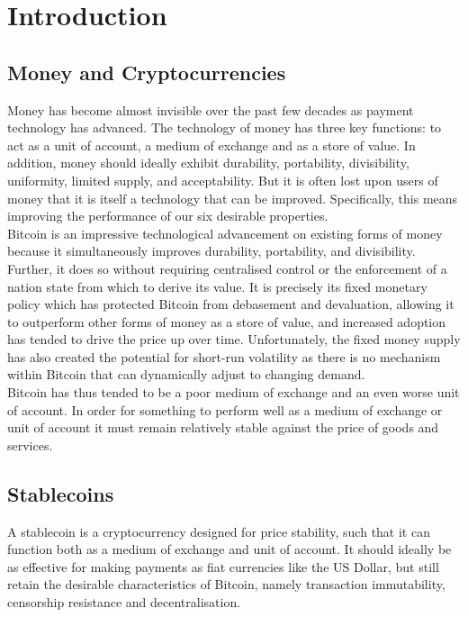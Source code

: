 \section{Introduction}

\subsection{Money and Cryptocurrencies}

Money has become almost invisible over the past few decades as payment technology has advanced. The technology of money has three key functions: to act as a unit of account, a medium of exchange
and as a store of value. In addition, money should ideally exhibit durability, portability, divisibility, uniformity, limited supply, and acceptability. But it is often lost upon users of money that it is itself a technology that can be improved. Specifically, this means improving the performance of our six desirable properties. \\

\noindent Bitcoin is an impressive technological advancement on existing forms of money because it
simultaneously improves durability, portability, and divisibility.
Further, it does so without requiring centralised control or the enforcement of a nation state from which to derive its value. It is precisely its fixed monetary policy which has protected Bitcoin from debasement and
devaluation, allowing it to outperform other forms of money as a store of value, and increased adoption
has tended to drive the price up over time. Unfortunately, the fixed money supply has also created the
potential for short-run volatility as there is no mechanism within Bitcoin that can dynamically
adjust to changing demand. \\

\noindent Bitcoin has thus tended to be a poor medium of exchange and an even worse unit of account.
In order for something to perform well as a medium of exchange or unit of account it must remain
relatively stable against the price of goods and services.

\subsection{Stablecoins}

\noindent A stablecoin is a cryptocurrency designed for price stability, such that it can function both as a medium of exchange and unit of account. It should ideally be as effective for making payments
as fiat currencies like the US Dollar, but still retain the desirable characteristics of Bitcoin, namely
transaction immutability, censorship resistance and decentralisation. \\

